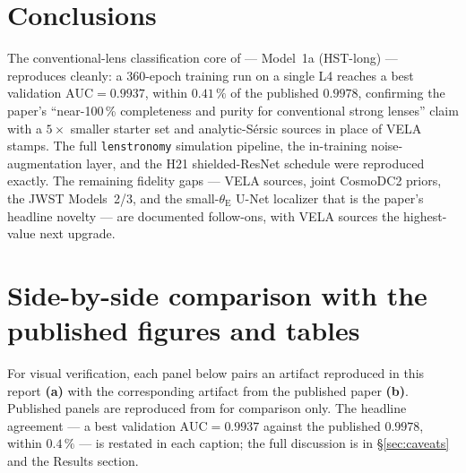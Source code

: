 \documentclass[11pt,letterpaper]{article}
\newcommand{\thetaE}{\ensuremath{\theta_{\mathrm{E}}}}
\begin{document}
\section{Conclusions}

The conventional-lens classification core of \citet{silver2025ml} ---
Model~1a (HST-long) --- reproduces cleanly: a 360-epoch training run on a
single L4 reaches a best validation $\mathrm{AUC} = 0.9937$, within
$0.41\,\%$ of the published $0.9978$, confirming the paper's
``near-100\,\% completeness and purity for conventional strong lenses''
claim with a $5\times$ smaller starter set and analytic-S\'ersic sources
in place of VELA stamps. The full \texttt{lenstronomy} simulation
pipeline, the in-training noise-augmentation layer, and the H21
shielded-ResNet schedule were reproduced exactly. The remaining fidelity
gaps --- VELA sources, joint CosmoDC2 priors, the JWST Models~2/3, and
the small-$\thetaE$ U-Net localizer that is the paper's headline novelty
--- are documented follow-ons, with VELA sources the highest-value next
upgrade.

\appendix
\section{Side-by-side comparison with the published figures and tables}
\label{app:compare}

For visual verification, each panel below pairs an artifact reproduced in this
report \textbf{(a)} with the corresponding artifact from the published paper
\textbf{(b)}. Published panels are reproduced from \citet{silver2025ml} for
comparison only. The headline agreement --- a best validation
$\mathrm{AUC} = 0.9937$ against the published $0.9978$, within $0.4\,\%$ --- is
restated in each caption; the full discussion is in
\S\ref{sec:caveats} and the Results section.
\end{document}

